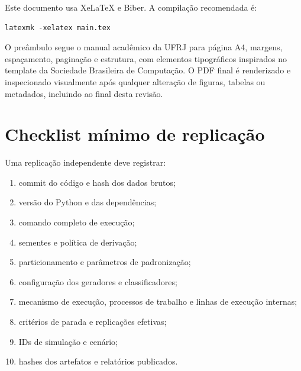 Este documento usa XeLaTeX e Biber. A compilação recomendada é:

\begin{verbatim}
latexmk -xelatex main.tex
\end{verbatim}

O preâmbulo segue o manual acadêmico da UFRJ para página A4, margens, espaçamento, paginação e estrutura, com elementos tipográficos inspirados no template da Sociedade Brasileira de Computação. O PDF final é renderizado e inspecionado visualmente após qualquer alteração de figuras, tabelas ou metadados, incluindo ao final desta revisão.

\section{Checklist mínimo de replicação}

Uma replicação independente deve registrar:

\begin{enumerate}
  \item commit do código e hash dos dados brutos;
  \item versão do Python e das dependências;
  \item comando completo de execução;
  \item sementes e política de derivação;
  \item particionamento e parâmetros de padronização;
  \item configuração dos geradores e classificadores;
  \item mecanismo de execução, processos de trabalho e linhas de execução internas;
  \item critérios de parada e replicações efetivas;
  \item IDs de simulação e cenário;
  \item hashes dos artefatos e relatórios publicados.
\end{enumerate}
